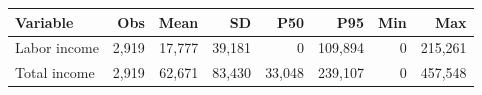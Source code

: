 \begin{tabular*}{\linewidth}{@{\extracolsep{\fill}}lrrrrrrr}\toprule
Variable & Obs & Mean & SD & P50 & P95 & Min & Max \\
\midrule
Labor income & 2,919 & 17,777 & 39,181 & 0 & 109,894 & 0 & 215,261 \\
Total income & 2,919 & 62,671 & 83,430 & 33,048 & 239,107 & 0 & 457,548 \\
\bottomrule
\end{tabular*}
